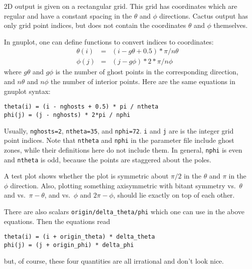 2D output is given on a rectangular grid.  This grid has coordinates
which are regular and have a constant spacing in the $\theta$ and
$\phi$ directions.  Cactus output has only grid point indices, but
does not contain the coordinates $\theta$ and $\phi$ themselves.

In gnuplot, one can define functions to convert indices to
coordinates:
\begin{eqnarray}
  \theta(i) & = & (i - g\theta + 0.5) * \pi   / n\theta
  \\
  \phi(j)   & = & (j - g\phi        ) * 2*\pi / n\phi
\end{eqnarray}
where $g\theta$ and $g\phi$ is the number of ghost points in the
corresponding direction, and $n\theta$ and $n\phi$ the number of
interior points.  Here are the same equations in gnuplot syntax:
\begin{verbatim}
theta(i) = (i - nghosts + 0.5) * pi / ntheta
phi(j) = (j - nghosts) * 2*pi / nphi
\end{verbatim}

Usually, \verb|nghosts=2|, \verb|ntheta=35|, and \verb|nphi=72|.
\verb|i| and \verb|j| are is the integer grid point indices.  Note
that \verb|ntheta| and \verb|nphi| in the parameter file include ghost
zones, while their definitions here do not include them.  In general,
\verb|nphi| is even and \verb|ntheta| is odd, because the points are
staggered about the poles.

A test plot shows whether the plot is symmetric about $\pi/2$ in the
$\theta$ and $\pi$ in the $\phi$ direction.  Also, plotting something
axisymmetric with bitant symmetry vs.\ $\theta$ and vs.\ $\pi-\theta$,
and vs.\ $\phi$ and $2\pi-\phi$, should lie exactly on top of each
other.

There are also scalars \verb|origin/delta_theta/phi| which one can use
in the above equations.  Then the equations read
\begin{verbatim}
theta(i) = (i + origin_theta) * delta_theta
phi(j) = (j + origin_phi) * delta_phi
\end{verbatim}
but, of course, these four quantities are all irrational and don't
look nice.



\begin{thebibliography}{9}

\end{thebibliography}



